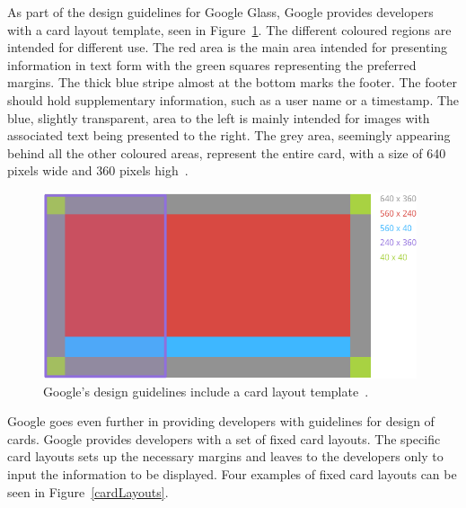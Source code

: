 As part of the design guidelines for Google Glass, Google provides developers with a card layout template, seen in Figure~\ref{GlassDesignStyle}. The different coloured regions are intended for different use. The red area is the main area intended for presenting information in text form with the green squares representing the preferred margins. The thick blue stripe almost at the bottom marks the footer. The footer should hold supplementary information, such as a user name or a timestamp. The blue,  slightly transparent, area to the left is mainly intended for images with associated text being presented to the right. The grey area, seemingly appearing behind all the other coloured areas, represent the entire card, with a size of 640 pixels wide and 360 pixels high~\cite{glassDesignStyle}.

	\begin{figure}[ht!]
		\centering
		\includegraphics[width=110mm]{images/standard-template}
		\caption{Google's design guidelines include a card layout template~\cite{glassDesignStyle}.}
		\label{GlassDesignStyle}
	\end{figure}

Google goes even further in providing developers with guidelines for design of cards. Google provides developers with a set of fixed card layouts. The specific card layouts sets up the necessary margins and leaves to the developers only to input the information to be displayed. Four examples of fixed card layouts can be seen in Figure~\ref{cardLayouts}.


